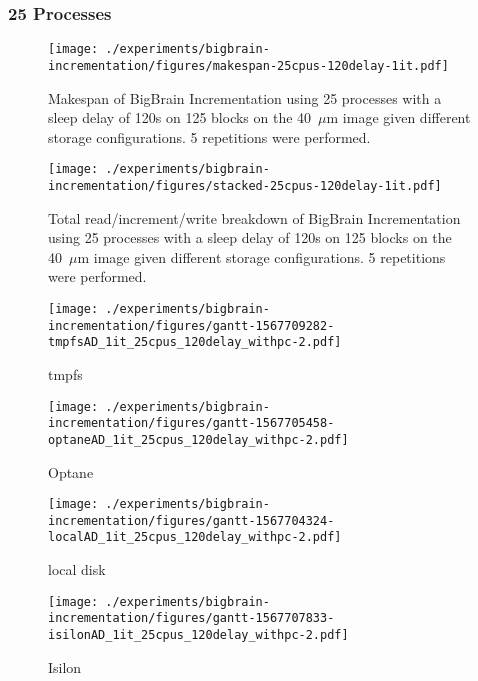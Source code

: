 \documentclass[conference]{IEEEtran}
\newcommand{\bigbrain}{BigBrain\xspace}
\begin{document}
\subsubsection{25 Processes}
\begin{figure}
    \texttt{[image: ./experiments/bigbrain-incrementation/figures/makespan-25cpus-120delay-1it.pdf]}
    \captionsetup{width=\columnwidth}
    \caption{Makespan of \bigbrain Incrementation using 25 processes with a sleep delay of 120s on 125 blocks on the 40~$\mu$m image given different storage configurations. 5 repetitions were performed.}\label{fig:makespan-25cpus}
\end{figure}
\begin{figure}
    \texttt{[image: ./experiments/bigbrain-incrementation/figures/stacked-25cpus-120delay-1it.pdf]}
    \captionsetup{width=\columnwidth}
    \caption{Total read/increment/write breakdown of \bigbrain Incrementation using 25 processes with a sleep delay of 120s on 125 blocks on the 40~$\mu$m image given different storage configurations. 5 repetitions were performed.}\label{fig:stacked-25cpus}
\end{figure}
\begin{figure*}
    \begin{subfigure}{\columnwidth}
        \centering
    \texttt{[image: ./experiments/bigbrain-incrementation/figures/gantt-1567709282-tmpfsAD\_1it\_25cpus\_120delay\_withpc-2.pdf]}
    \caption{tmpfs}
\end{subfigure}
\begin{subfigure}{\columnwidth}
        \centering
    \texttt{[image: ./experiments/bigbrain-incrementation/figures/gantt-1567705458-optaneAD\_1it\_25cpus\_120delay\_withpc-2.pdf]}
    \caption{Optane}
\end{subfigure}
\begin{subfigure}{\columnwidth}
        \centering
    \texttt{[image: ./experiments/bigbrain-incrementation/figures/gantt-1567704324-localAD\_1it\_25cpus\_120delay\_withpc-2.pdf]}
    \caption{local disk}
\end{subfigure}
\begin{subfigure}{\columnwidth}
        \centering
    \texttt{[image: ./experiments/bigbrain-incrementation/figures/gantt-1567707833-isilonAD\_1it\_25cpus\_120delay\_withpc-2.pdf]}
    \caption{Isilon}\label{fig:gantt25isilon}
\end{subfigure}
\caption{Gantt charts for each storage device (App Direct Mode) processing 125 blocks of the 40$\mu$m BigBrain using 25 processes and a sleep delay of 120s}\label{fig:gantt25}
\end{figure*}
\end{document}
